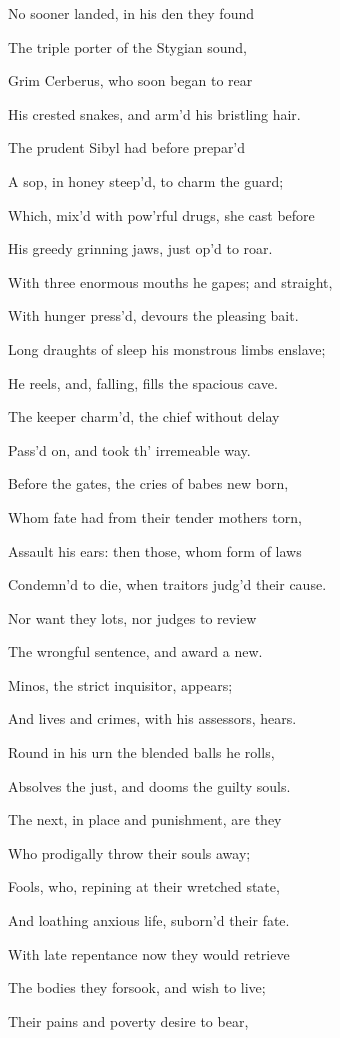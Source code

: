 No sooner landed, in his den they found

The triple porter of the Stygian sound,

Grim Cerberus, who soon began to rear

His crested snakes, and arm’d his bristling hair.

The prudent Sibyl had before prepar’d

A sop, in honey steep’d, to charm the guard;

Which, mix’d with pow’rful drugs, she cast before

His greedy grinning jaws, just op’d to roar.

With three enormous mouths he gapes; and straight,

With hunger press’d, devours the pleasing bait.

Long draughts of sleep his monstrous limbs enslave;

He reels, and, falling, fills the spacious cave.

The keeper charm’d, the chief without delay

Pass’d on, and took th’ irremeable way.

Before the gates, the cries of babes new born,

Whom fate had from their tender mothers torn,

Assault his ears: then those, whom form of laws

Condemn’d to die, when traitors judg’d their cause.

Nor want they lots, nor judges to review

The wrongful sentence, and award a new.

Minos, the strict inquisitor, appears;

And lives and crimes, with his assessors, hears.

Round in his urn the blended balls he rolls,

Absolves the just, and dooms the guilty souls.

The next, in place and punishment, are they

Who prodigally throw their souls away;

Fools, who, repining at their wretched state,

And loathing anxious life, suborn’d their fate.

With late repentance now they would retrieve

The bodies they forsook, and wish to live;

Their pains and poverty desire to bear,

